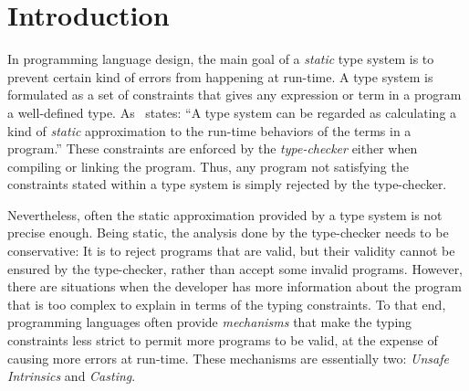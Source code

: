 
\chapter{Introduction}

In programming language design, the main goal of a \emph{static} type system is to prevent certain kind of errors from happening at run-time.
A type system is formulated as a set of constraints that gives any expression or term in a program a well-defined type.
As~\cite{pierceTypesProgrammingLanguages2002} states: ``A type system can be regarded as calculating a kind of \emph{static} approximation to the run-time behaviors of the terms in a program.''
These constraints are enforced by the \emph{type-checker} either when compiling or linking the program.
Thus, any program not satisfying the constraints stated within a type system is simply rejected by the type-checker.

Nevertheless, often the static approximation provided by a type system is not precise enough.
Being static, the analysis done by the type-checker needs to be conservative:
It is
to reject programs that are valid, but their validity cannot be ensured by the type-checker,
rather than accept some invalid programs.
However, there are situations when the developer has more information about the program that is too complex to explain in terms of the typing constraints.
To that end, programming languages often provide \emph{mechanisms} that 
make the typing constraints less strict
to permit more programs to be valid,
at the expense of causing more errors at run-time.
These mechanisms are essentially two:
\emph{Unsafe Intrinsics} and \emph{Casting}.

